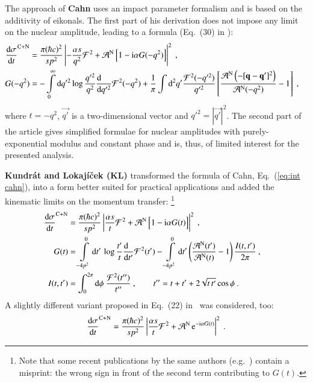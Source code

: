 The approach of {\bf Cahn} \cite{cahn82} uses an impact parameter formalism and is based on the additivity of eikonals. The first part of his derivation does not impose any limit on the nuclear amplitude, leading to a formula (Eq.~(30) in \cite{cahn82}):
\begin{equation}
\label{eq:int cahn}
	\begin{aligned}
		{\d\sigma\over \d t}^{\rm C+N} &= {\pi (\hbar c)^2 \over s p^2} \left | -{\alpha s\over q^2} {\cal F}^2
			+ {\cal A}^{\rm N}\, \Big[1 - \I\alpha G(-q^2)\Big] \right |^2\ ,\cr
		G(-q^2) &= - \int\limits_0^\infty \d q'^2 \log {q'^2\over q^2} {\d\phantom{q'^2}\over \d q'^2} {\cal F}^2(-q^2)
					+ {1\over\pi} \int\d^2 q' {{\cal F}^2(-q'^2)\over q'^2} \left[ {{\cal A}^{\rm N}\left(-[\vec{q} - \vec{q'}]^2\right) \over {\cal A}^{\rm N}(-q^2)} - 1 \right]
			\ , \cr
	\end{aligned}
\end{equation}
where $t=-q^2$, $\vec{q'}$ is a two-dimensional vector and $q'^2 = |\vec{q'}|^2$. The second part of the article gives simplified formulae for nuclear amplitudes with purely-exponential modulus and constant phase and is, thus, of limited interest for the presented analysis.

{\bf Kundr\' at and Lokaj\' i\v cek (KL)} \cite{kl94} transformed the formula of Cahn, Eq.~(\ref{eq:int cahn}), into a form better suited for practical applications and added the kinematic limits on the momentum transfer: \footnote{%
Note that some recent publications by the same authors (e.g.~\cite{kl05,kklp11}) contain a misprint: the wrong sign in front of the second term contributing to $G(t)$.
}
\begin{equation}
\label{eq:int kl}
	\begin{aligned}
		{\d\sigma\over \d t}^{\rm C+N} &= {\pi (\hbar c)^2 \over s p^2} \left | {\alpha s\over t} {\cal F}^2
			+ {\cal A}^{\rm N}\, \Big[1 - \I\alpha G(t)\Big] \right |^2\ ,\cr
		G(t) &= 
			\int\limits_{-4p^2}^0 \d t'\, \log {t'\over t} {\d\phantom{t'}\over \d t'} {\cal F}^2(t')
			- \int\limits_{-4p^2}^0 \d t' \left( {{\cal A}^{\rm N}(t') \over {\cal A}^{\rm N}(t)} - 1 \right) { I(t, t')\over 2\pi }
			\ , \cr
		I(t, t') &= \int_0^{2\pi} \d\phi\ {{\cal F}^2(t'')\over t''}\ ,\qquad t'' = t + t' + 2\sqrt{t\, t'} \cos\phi\ .\cr
	\end{aligned}
\end{equation}
A slightly different variant proposed in Eq.~(22) in~\cite{kl05} was considered, too:
\begin{equation}
\label{eq:int kl exp}
	{\d\sigma\over \d t}^{\rm C+N} = {\pi (\hbar c)^2 \over s p^2} \left | {\alpha s\over t} {\cal F}^2
		+ {\cal A}^{\rm N}\, \e^{- \I\alpha G(t)} \right |^2 \ .
\end{equation}

